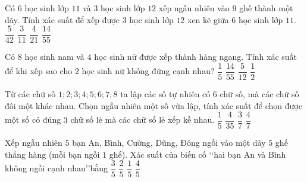 \begin{ex}%
Có $6$ học sinh lớp $11$ và $3$ học sinh lớp $12$ xếp ngẫu nhiên vào $9$ ghế thành một dãy. Tính xác suất để xếp được $3$ học sinh lớp $12$ xen kẽ giữa $6$ học sinh lớp $11$.
\choice
{\True $\dfrac{5}{42}$}
{$\dfrac{3}{11}$}
{$\dfrac{4}{21}$}
{$\dfrac{14}{55}$}
\end{ex}

\begin{ex}%
Có $8$ học sinh nam và $4$ học sinh nữ được xếp thành hàng ngang. Tính xác suất để khi xếp sao cho $2$ học sinh nữ không đứng cạnh nhau?
\choice
{$\dfrac{1}{5}$}
{\True $\dfrac{14}{55}$}
{$\dfrac{5}{12}$}
{$\dfrac{1}{2}$}
\end{ex}

\begin{ex}%
Từ các chữ số $1; 2; 3; 4; 5; 6; 7; 8$ ta lập các số tự nhiên có $6$ chữ số, mà các chữ số đôi một khác nhau. Chọn ngẫu nhiên một số vừa lập, tính xác suất để chọn được một số có đúng $3$ chữ số lẻ mà các chữ số lẻ xếp kề nhau.
\choice
{$\dfrac{1}{5}$}
{\True $\dfrac{4}{35}$}
{$\dfrac{3}{7}$}
{$\dfrac{4}{7}$}
\end{ex}

\begin{ex}%
Xếp ngẫu nhiên $5$ bạn An, Bình, Cường, Dũng, Đông ngồi vào một dãy $5$ ghế thẳng hàng (mỗi bạn ngồi $1$ ghế). Xác suất của biến cố \lq\lq hai bạn An và Bình không ngồi cạnh nhau\rq\rq bằng
\choice
{\True $\dfrac{3}{5}$}
{$\dfrac{2}{5}$}
{$\dfrac{1}{5}$}
{$\dfrac{4}{5}$}
\end{ex}




